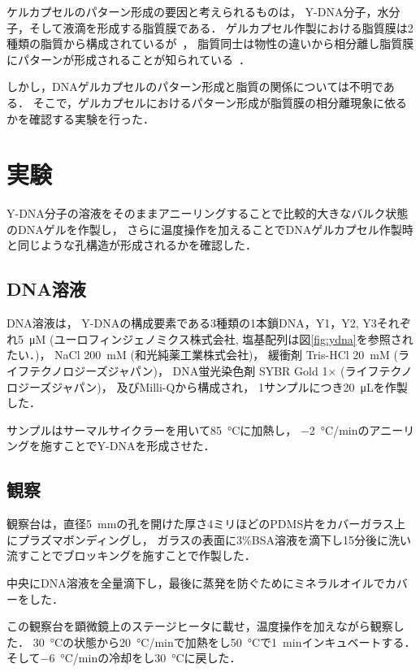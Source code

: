 ケルカプセルのパターン形成の要因と考えられるものは，
Y-DNA分子，水分子，そして液滴を形成する脂質膜である．
ゲルカプセル作製における脂質膜は2種類の脂質から構成されているが~\cite{morita2017formation}，
脂質同士は物性の違いから相分離し脂質膜にパターンが形成されることが知られている~\cite{yanagisawa2014multiple}．

しかし，DNAゲルカプセルのパターン形成と脂質の関係については不明である．
そこで，ゲルカプセルにおけるパターン形成が脂質膜の相分離現象に依るかを確認する実験を行った．

\section{実験}
Y-DNA分子の溶液をそのままアニーリングすることで比較的大きなバルク状態のDNAゲルを作製し，
さらに温度操作を加えることでDNAゲルカプセル作製時と同じような孔構造が形成されるかを確認した．

\subsection{DNA溶液}
DNA溶液は，
Y-DNAの構成要素である3種類の1本鎖DNA，Y1，Y2, Y3それぞれ\SI{5}{\micro M} (ユーロフィンジェノミクス株式会社, 塩基配列は図\ref{fig:ydna}を参照されたい．)，
NaCl \SI{200}{mM} (和光純薬工業株式会社)，
緩衝剤 Tris-HCl \SI{20}{mM} (ライフテクノロジーズジャパン)，
DNA蛍光染色剤 SYBR Gold 1× (ライフテクノロジーズジャパン)，
及びMilli-Qから構成され，
1サンプルにつき\SI{20}{\micro L}を作製した．

サンプルはサーマルサイクラーを用いて\SI{85}{\celsius}に加熱し，
\SI{-2}{\celsius/min}のアニーリングを施すことでY-DNAを形成させた．

\subsection{観察}
観察台は，直径\SI{5}{mm}の孔を開けた厚さ4ミリほどのPDMS片をカバーガラス上にプラズマボンディングし，
ガラスの表面に3\%BSA溶液を滴下し15分後に洗い流すことでブロッキングを施すことで作製した．

中央にDNA溶液を全量滴下し，最後に蒸発を防ぐためにミネラルオイルでカバーをした．

この観察台を顕微鏡上のステージヒータに載せ，温度操作を加えながら観察した．
\SI{30}{\celsius}の状態から\SI{20}{\celsius/min}で加熱をし\SI{50}{\celsius}で\SI{1}{min}インキュベートする．
そして\SI{-6}{\celsius/min}の冷却をし\SI{30}{\celsius}に戻した．


